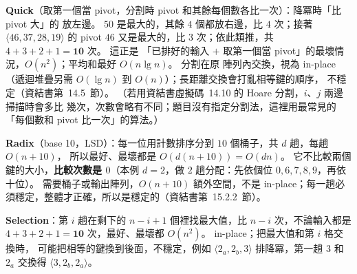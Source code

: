 \begin{pastsoln}
\textbf{Quick}（取第一個當 pivot，分割時 pivot 和其餘每個數各比一次）：降冪時「比 pivot 大」的
放左邊。 $50$ 是最大的，其餘 $4$ 個都放右邊，比 $4$ 次；接著 $\langle 46, 37, 28, 19 \rangle$
的 pivot $46$ 又是最大的，比 $3$ 次；依此類推，共 $4 + 3 + 2 + 1 = \mathbf{10}$ 次。 這正是
「已排好的輸入 $+$ 取第一個當 pivot」的最壞情況，$O(n^2)$；平均和最好 $O(n \lg n)$。 分割在原
陣列內交換，視為 in-place（遞迴堆疊另需 $O(\lg n)$ 到 $O(n)$）；長距離交換會打亂相等鍵的順序，
不穩定（資結書第~14.5~節）。 （若用資結書虛擬碼~14.10 的 Hoare 分割，$i$、$j$ 兩邊掃描時會多比
幾次，次數會略有不同；題目沒有指定分割法，這裡用最常見的「每個數和 pivot 比一次」的算法。）

\textbf{Radix}（base 10，LSD）：每一位用計數排序分到 $10$ 個桶子，共 $d$ 趟，每趟 $O(n + 10)$，
所以最好、最壞都是 $O(d(n + 10)) = O(dn)$。 它不比較兩個鍵的大小，\textbf{比較次數是 $0$}（本例
$d = 2$，做 $2$ 趟分配：先依個位 $0, 6, 7, 8, 9$，再依十位）。 需要桶子或輸出陣列，$O(n + 10)$
額外空間，不是 in-place；每一趟必須穩定，整體才正確，所以是穩定的（資結書第~15.2.2~節）。

\textbf{Selection}：第 $i$ 趟在剩下的 $n - i + 1$ 個裡找最大值，比 $n - i$ 次，不論輸入都是
$4 + 3 + 2 + 1 = \mathbf{10}$ 次，最好、最壞都 $O(n^2)$。 in-place；把最大值和第 $i$ 格交換時，
可能把相等的鍵換到後面，不穩定，例如 $\langle 2_a, 2_b, 3 \rangle$ 排降冪，第一趟 $3$ 和 $2_a$
交換得 $\langle 3, 2_b, 2_a \rangle$。
\end{pastsoln}
